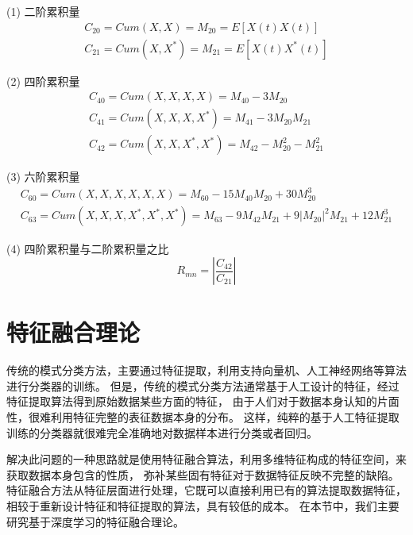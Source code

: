 (1) 二阶累积量
\begin{equation}
\label{eqt_4_10}
\begin{aligned}
C_{20} = Cum(X, X) = M_{20} = E[X(t)X(t)]\\
C_{21} = Cum(X, X^*) = M_{21} = E[X(t)X^*(t)]	
\end{aligned}
\end{equation}

(2) 四阶累积量
\begin{equation}
\label{eqt_4_11}
\begin{aligned}
C_{40}=Cum(X, X, X, X) = M_{40} - 3M_{20}\\
C_{41}=Cum(X, X, X, X^*) = M_{41} - 3M_{20}M_{21}\\
C_{42}=Cum(X, X, X^*, X^*) = M_{42} - M_{20}^2 - M_{21}^2
\end{aligned}
\end{equation}

(3) 六阶累积量
\begin{equation}
\label{eqt_4_12}
\begin{aligned}
C_{60}=Cum(X, X, X, X, X, X) = M_{60} - 15M_{40}M_{20} + 30M_{20}^3\\
C_{63}=Cum(X, X, X, X^*, X^*, X^*) = M_{63} - 9M_{42}M_{21} 
+ 9\left|M_{20}\right|^2M_{21} + 12M_{21}^3
\end{aligned}
\end{equation}

(4) 四阶累积量与二阶累积量之比
\begin{equation}
\label{eqt_4_13}
R_{mn} = |\frac{C_{42}}{C_{21}}|
\end{equation}

\section{特征融合理论}
传统的模式分类方法，主要通过特征提取，利用支持向量机、人工神经网络等算法进行分类器的训练。 
但是，传统的模式分类方法通常基于人工设计的特征，经过特征提取算法得到原始数据某些方面的特征，
由于人们对于数据本身认知的片面性，很难利用特征完整的表征数据本身的分布。
这样，纯粹的基于人工特征提取训练的分类器就很难完全准确地对数据样本进行分类或者回归。\par

解决此问题的一种思路就是使用特征融合算法，利用多维特征构成的特征空间，来获取数据本身包含的性质，
弥补某些固有特征对于数据特征反映不完整的缺陷。
特征融合方法从特征层面进行处理，它既可以直接利用已有的算法提取数据特征，
相较于重新设计特征和特征提取的算法，具有较低的成本。
在本节中，我们主要研究基于深度学习的特征融合理论。\par

